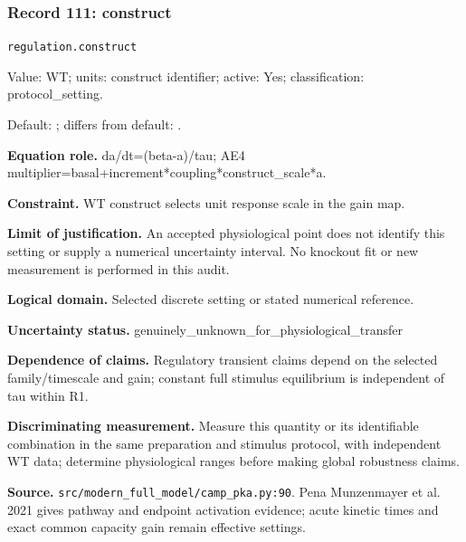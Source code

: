 \subsubsection*{Record 111: construct}
{\small \nolinkurl{regulation.construct}\par

Value: WT; units: construct identifier; active: Yes; classification: protocol\_setting.\par

Default: ; differs from default: .\par

\textbf{Equation role.} da/dt=(beta-a)/tau; AE4 multiplier=basal+increment*coupling*construct\_scale*a.\par

\textbf{Constraint.} WT construct selects unit response scale in the gain map.\par

\textbf{Limit of justification.} An accepted physiological point does not identify this setting or supply a numerical uncertainty interval. No knockout fit or new measurement is performed in this audit.\par

\textbf{Logical domain.} Selected discrete setting or stated numerical reference.\par

\textbf{Uncertainty status.} genuinely\_unknown\_for\_physiological\_transfer\par

\textbf{Dependence of claims.} Regulatory transient claims depend on the selected family/timescale and gain; constant full stimulus equilibrium is independent of tau within R1.\par

\textbf{Discriminating measurement.} Measure this quantity or its identifiable combination in the same preparation and stimulus protocol, with independent WT data; determine physiological ranges before making global robustness claims.\par

\textbf{Source.} \nolinkurl{src/modern_full_model/camp_pka.py:90}. Pena Munzenmayer et al. 2021 gives pathway and endpoint activation evidence; acute kinetic times and exact common capacity gain remain effective settings.\par}

